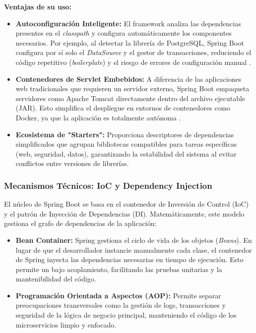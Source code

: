 \textbf{Ventajas de su uso:}
\begin{itemize}
\item \textbf{Autoconfiguración Inteligente:} El framework analiza las dependencias presentes en el \textit{classpath} y configura automáticamente los componentes necesarios. Por ejemplo, al detectar la librería de PostgreSQL, Spring Boot configura por sí solo el \textit{DataSource} y el gestor de transacciones, reduciendo el código repetitivo (\textit{boilerplate}) y el riesgo de errores de configuración manual \cite{38} .

\item \textbf{Contenedores de Servlet Embebidos:} A diferencia de las aplicaciones web tradicionales que requieren un servidor externo, Spring Boot empaqueta servidores como Apache Tomcat directamente dentro del archivo ejecutable (JAR). Esto simplifica el despliegue en entornos de contenedores como Docker, ya que la aplicación es totalmente autónoma \cite{38} .

\item \textbf{Ecosistema de "Starters":} Proporciona descriptores de dependencias simplificados que agrupan bibliotecas compatibles para tareas específicas (web, seguridad, datos), garantizando la estabilidad del sistema al evitar conflictos entre versiones de librerías.

\end{itemize}

\subsubsection{Mecanismos Técnicos: IoC y Dependency Injection}

El núcleo de Spring Boot se basa en el contenedor de Inversión de Control (IoC) y el patrón de Inyección de Dependencias (DI). Matemáticamente, este modelo gestiona el grafo de dependencias de la aplicación:
\begin{itemize}
\item \textbf{Bean Container:} Spring gestiona el ciclo de vida de los objetos (\textit{Beans}). En lugar de que el desarrollador instancie manualmente cada clase, el contenedor de Spring inyecta las dependencias necesarias en tiempo de ejecución. Esto permite un bajo acoplamiento, facilitando las pruebas unitarias y la mantenibilidad del código.
\item \textbf{Programación Orientada a Aspectos (AOP):} Permite separar preocupaciones transversales como la gestión de logs, transacciones y seguridad de la lógica de negocio principal, manteniendo el código de los microservicios limpio y enfocado.
\end{itemize}

